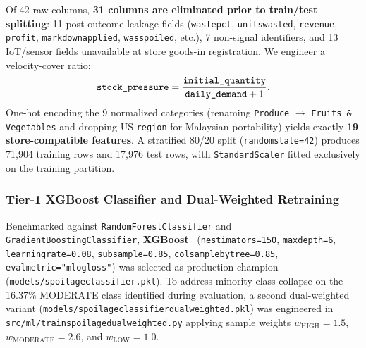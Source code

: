 \documentclass[11pt,a4paper]{article}
\renewcommand{\_}{\oldunderscore\allowbreak}
\begin{document}
Of 42 raw columns, \textbf{31 columns are eliminated prior to train/test splitting}: 11 post-outcome leakage fields (\texttt{waste\_pct}, \texttt{units\_wasted}, \texttt{revenue}, \texttt{profit}, \texttt{markdown\_applied}, \texttt{was\_spoiled}, etc.), 7 non-signal identifiers, and 13 IoT/sensor fields unavailable at store goods-in registration. We engineer a velocity-cover ratio:
\begin{equation}
    \texttt{stock\_pressure} = \frac{\texttt{initial\_quantity}}{\texttt{daily\_demand} + 1}.
\end{equation}
One-hot encoding the 9 normalized categories (renaming \texttt{Produce} $\to$ \texttt{Fruits \& Vegetables} and dropping US \texttt{region} for Malaysian portability) yields exactly \textbf{19 store-compatible features}. A stratified 80/20 split (\texttt{random\_state=42}) produces 71,904 training rows and 17,976 test rows, with \texttt{StandardScaler} fitted exclusively on the training partition.

\subsubsection{Tier-1 XGBoost Classifier and Dual-Weighted Retraining}
Benchmarked against \texttt{RandomForestClassifier} and \texttt{GradientBoostingClassifier}, \textbf{XGBoost}~\cite{chen2016xgboost} (\texttt{n\_estimators=150}, \texttt{max\_depth=6}, \texttt{learning\_rate=0.08}, \texttt{subsample=0.85}, \texttt{colsample\_bytree=0.85}, \texttt{eval\_metric="mlogloss"}) was selected as production champion (\texttt{models/spoilage\_classifier.pkl}). To address minority-class collapse on the 16.37\% MODERATE class identified during evaluation, a second dual-weighted variant (\texttt{models/spoilage\_classifier\_dual\_weighted.pkl}) was engineered in \texttt{src/ml/train\_spoilage\_dual\_weighted.py} applying sample weights $w_{\text{HIGH}} = 1.5$, $w_{\text{MODERATE}} = 2.6$, and $w_{\text{LOW}} = 1.0$.
\end{document}
